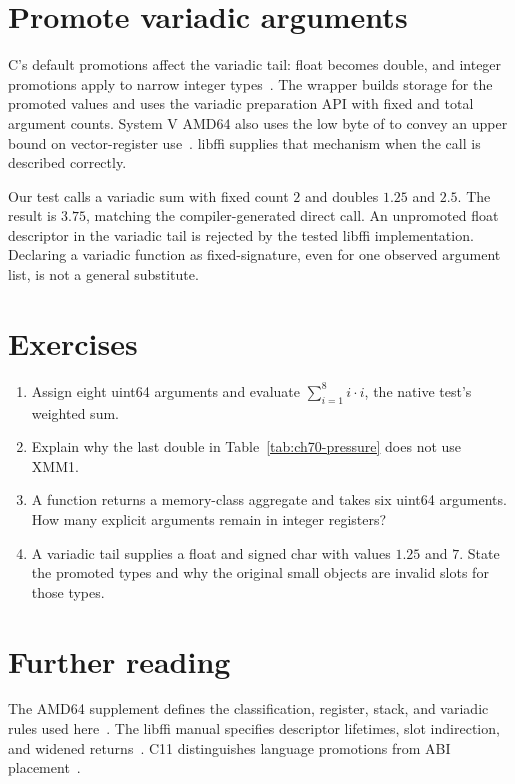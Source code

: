 \section{Promote variadic arguments}
\label{sec:ch70-varargs}
C's default promotions affect the variadic tail: float becomes double, and integer promotions apply to narrow integer types~\cite{wg14-2011-c11}.
The wrapper builds storage for the promoted values and uses the variadic preparation API with fixed and total argument counts.
System V AMD64 also uses the low byte of  to convey an upper bound on vector-register use~\cite{matz-2012-amd64}.
libffi supplies that mechanism when the call is described correctly.

Our test calls a variadic sum with fixed count $2$ and doubles $1.25$ and $2.5$.
The result is $3.75$, matching the compiler-generated direct call.
An unpromoted float descriptor in the variadic tail is rejected by the tested libffi implementation.
Declaring a variadic function as fixed-signature, even for one observed argument list, is not a general substitute.

\section{Exercises}
\label{sec:ch70-exercises}
\begin{enumerate}
\item\label{ex:ch70-eight} Assign eight uint64 arguments and evaluate $\sum_{i=1}^{8}i\cdot i$, the native test's weighted sum.
\item\label{ex:ch70-rollback} Explain why the last double in Table~\ref{tab:ch70-pressure} does not use XMM1.
\item\label{ex:ch70-hidden} A function returns a memory-class aggregate and takes six uint64 arguments.
How many explicit arguments remain in integer registers?
\item\label{ex:ch70-promote} A variadic tail supplies a float and signed char with values $1.25$ and $7$.
State the promoted types and why the original small objects are invalid slots for those types.
\end{enumerate}

\section{Further reading}
\label{sec:ch70-reading}
The AMD64 supplement defines the classification, register, stack, and variadic rules used here~\cite{matz-2012-amd64}.
The libffi manual specifies descriptor lifetimes, slot indirection, and widened returns~\cite{libffi-2026-manual}.
C11 distinguishes language promotions from ABI placement~\cite{wg14-2011-c11}.
